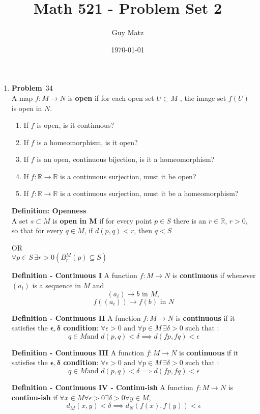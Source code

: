 \documentclass[12pt]{amsart}
\title{\textbf{Math 521 - Problem Set 2}}
\author{Guy Matz}
\date{\today}
\newcommand{\benu}{\begin{enumerate}}
\newcommand{\eenu}{\end{enumerate}}
\theoremstyle{definition}
\newcommand{\mbR}{\mathbb{R}}
\newcommand{\itep}{\item {\bfseries Problem}\ }
\begin{document}
 


\begin{enumerate}[series=p]
\itep 34 \\
A map $f:M \to N$ is \textbf{open} if for each open set $U \subset M$ , the image set $f(U)$ is open in $N$.
\\
\benu
\item If $f$ is open, is it continuous?
\item If $f$ is a homeomorphism, is it open?
\item If $f$ is an open, continuous bijection, is it a homeomorphism?
\item If $f : \mbR \to \mbR$ is a continuous surjection, must it be open? 
\item If $f : \mbR \to \mbR$ is a continuous surjection, must it be a homeomorphism? 
\eenu
\textbf{Definition: Openness}\\
	A set $s \subset M$ is \textbf{open in M} if for every point $p \in S$ there is an $r \in \mbR$, $r>0$, so that for every $q \in M$,
	if $d(p,q) < r$, then $q < S$
	\begin{center}
		OR
		\\
		$\forall p \in S \, \exists r > 0 (B_r^M(p) \subseteq S)$
	\end{center}
\textbf{Definition - Continuous I}
	A function $f:M \to N$ is \textbf{continuous} if whenever $(a_i)$ is a sequence in $M$ and
	$$(a_i) \to b \text{ in } M,$$
	$$f((a_i)) \to f(b) \text{ in } N$$


\textbf{Definition - Continuous II }
	A function $f:M \to N$ is \textbf{continuous} if it satisfies the $\boldsymbol{\epsilon, \delta}$ \textbf{condition}:
	$\forall \epsilon > 0 \text{ and } \forall p \in M \, \exists \delta > 0 \text{ such that }$:
	$$q \in M \text{and } d(p,q) < \delta \implies d(fp,fq) < \epsilon$$

\textbf{Definition - Continuous III }
	A function $f:M \to N$ is \textbf{continuous} if it satisfies the $\boldsymbol{\epsilon, \delta}$ \textbf{condition}:
	$\forall \epsilon > 0 \text{ and } \forall p \in M \, \exists \delta > 0 \text{ such that }$:
	$$q \in M \text{and } d(p,q) < \delta \implies d(fp,fq) < \epsilon$$


\textbf{Definition - Continuous IV - Continu-ish}
	A function $f:M \to N$ is \textbf{continu-ish} if
	$\forall x \in M \forall \epsilon > 0 \exists \delta > 0 \forall y \in M$,\\
	$$d_M(x,y) < \delta \implies d_N(f(x), f(y)) < \epsilon$$


\end{enumerate}
\end{document}
